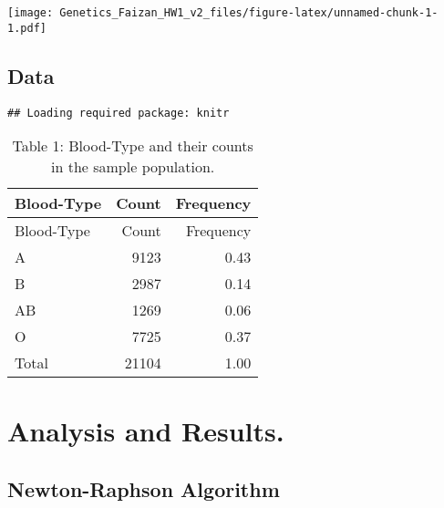 \documentclass[]{article}
\begin{document}
\texttt{[image: Genetics\_Faizan\_HW1\_v2\_files/figure-latex/unnamed-chunk-1-1.pdf]}

\subsection{Data}\label{data}

\begin{verbatim}
## Loading required package: knitr
\end{verbatim}

\begin{longtable}[]{@{}lrr@{}}
\caption{Table 1: Blood-Type and their counts in the sample
population.}\tabularnewline
\toprule
Blood-Type & Count & Frequency\tabularnewline
\midrule
\endfirsthead
\toprule
Blood-Type & Count & Frequency\tabularnewline
\midrule
\endhead
A & 9123 & 0.43\tabularnewline
B & 2987 & 0.14\tabularnewline
AB & 1269 & 0.06\tabularnewline
O & 7725 & 0.37\tabularnewline
Total & 21104 & 1.00\tabularnewline
\bottomrule
\end{longtable}

\section{Analysis and Results.}\label{analysis-and-results.}

\subsection{Newton-Raphson Algorithm}\label{newton-raphson-algorithm}
\end{document}

